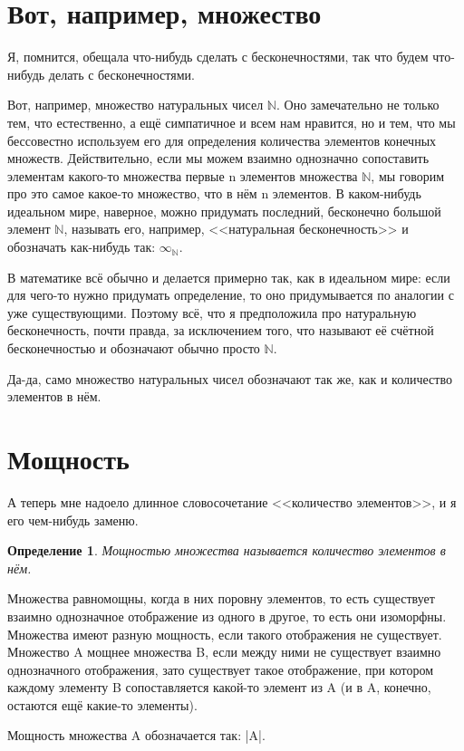\documentclass[12pt, onecolumn]{report}
\newtheorem{definition}{Определение}
\begin{document}
\section{Вот, например, множество}
Я, помнится, обещала что-нибудь сделать с бесконечностями, так что будем что-нибудь делать с бесконечностями.

Вот, например, множество натуральных чисел $\mathbb N$. Оно замечательно не только тем, что естественно, а ещё симпатичное и всем нам нравится, но и тем, что мы бессовестно используем его для определения количества элементов конечных множеств. Действительно, если мы можем взаимно однозначно сопоставить элементам какого-то множества первые n элементов множества $\mathbb N$, мы говорим про это самое какое-то множество, что в нём n элементов. В каком-нибудь идеальном мире, наверное, можно придумать последний, бесконечно большой элемент $\mathbb N$, называть его, например, <<натуральная бесконечность>> и обозначать как-нибудь так: ${\infty}_{\mathbb N}$.

В математике всё обычно и делается примерно так, как в идеальном мире: если для чего-то нужно придумать определение, то оно придумывается по аналогии с уже существующими. Поэтому всё, что я предположила про натуральную бесконечность, почти правда, за исключением того, что называют её счётной бесконечностью и обозначают обычно просто $\mathbb N$.

Да-да, само множество натуральных чисел обозначают так же, как и количество элементов в нём.

\section{Мощность}
А теперь мне надоело длинное словосочетание <<количество элементов>>, и я его чем-нибудь заменю.
\begin{definition}
Мощностью множества называется количество элементов в нём.
\end{definition}
Множества равномощны, когда в них поровну элементов, то есть существует взаимно однозначное отображение из одного в другое, то есть они изоморфны. Множества имеют разную мощность, если такого отображения не существует. Множество A мощнее множества B, если между ними не существует взаимно однозначного отображения, зато существует такое отображение, при котором каждому элементу B сопоставляется какой-то элемент из A (и в A, конечно, остаются ещё какие-то элементы).

Мощность множества A обозначается так: |A|.
\end{document}
